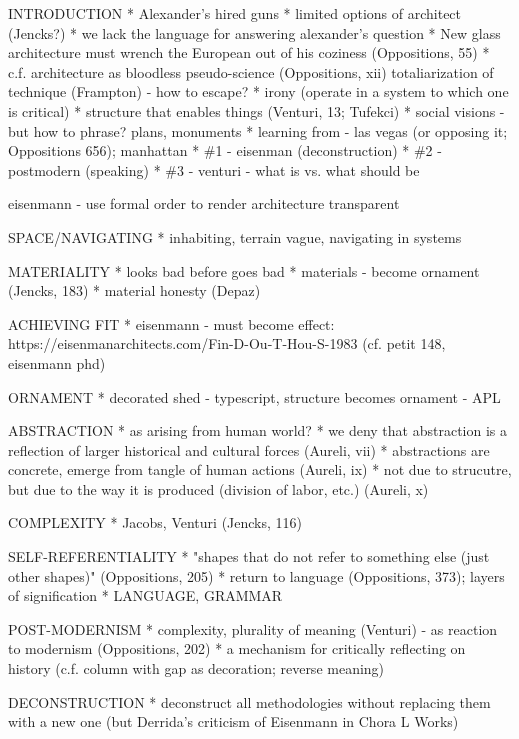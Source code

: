 INTRODUCTION
* Alexander's hired guns
* limited options of architect (Jencks?)
* we lack the language for answering alexander's question
* New glass architecture must wrench the European out of his coziness (Oppositions, 55)
* c.f. architecture as bloodless pseudo-science (Oppositions, xii)
  totaliarization of technique (Frampton) - how to escape?
* irony (operate in a system to which one is critical)
* structure that enables things (Venturi, 13; Tufekci)
* social visions - but how to phrase? plans, monuments
* learning from - las vegas (or opposing it; Oppositions 656); manhattan
* \#1 - eisenman (deconstruction)
* \#2 - postmodern (speaking)
* \#3 - venturi - what is vs. what should be



eisenmann - use formal order to render architecture transparent

SPACE/NAVIGATING
* inhabiting, terrain vague, navigating in systems

MATERIALITY
* looks bad before goes bad
* materials - become ornament (Jencks, 183)
* material honesty (Depaz)

ACHIEVING FIT
* eisenmann - must become effect: https://eisenmanarchitects.com/Fin-D-Ou-T-Hou-S-1983
  (cf. petit 148, eisenmann phd)

ORNAMENT
* decorated shed - typescript, structure becomes ornament - APL

ABSTRACTION
* as arising from human world?
* we deny that abstraction is a reflection of larger historical and cultural forces (Aureli, vii)
* abstractions are concrete, emerge from tangle of human actions (Aureli, ix)
* not due to strucutre, but due to the way it is produced (division of labor, etc.) (Aureli, x)

COMPLEXITY
* Jacobs, Venturi (Jencks, 116)

SELF-REFERENTIALITY
* "shapes that do not refer to something else (just other shapes)" (Oppositions, 205)
* return to language (Oppositions, 373); layers of signification
* LANGUAGE, GRAMMAR

POST-MODERNISM
* complexity, plurality of meaning (Venturi) - as reaction to modernism (Oppositions, 202)
* a mechanism for critically reflecting on history
  (c.f. column with gap as decoration; reverse meaning)

DECONSTRUCTION
* deconstruct all methodologies without replacing them with a new one
  (but Derrida's criticism of Eisenmann in Chora L Works)

